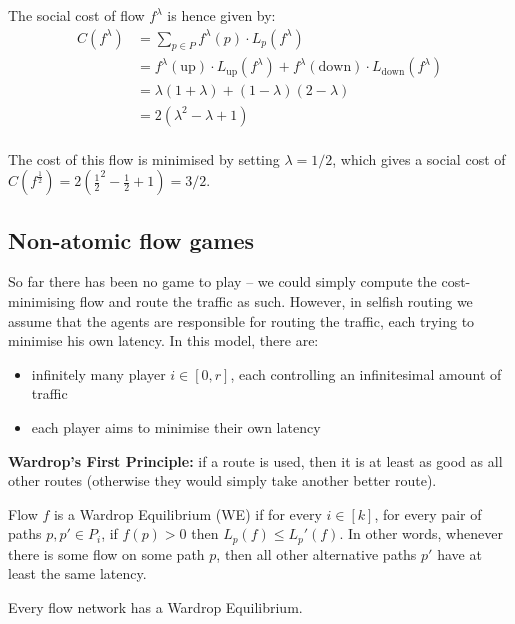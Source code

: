 The social cost of flow $f^\lambda$ is hence given by:
\begin{equation*}
	\begin{split}
		C(f^\lambda) & = \sum_{p\in P} f^\lambda (p) \cdot L_p(f^\lambda) \\
		& = f^\lambda (\text{up}) \cdot L_\text{up} (f^\lambda) + f^\lambda (\text{down}) \cdot L_\text{down}(f^\lambda) \\
		& = \lambda (1 + \lambda) + (1 - \lambda) (2 - \lambda) \\
		& = 2(\lambda^2 - \lambda + 1) \\
	\end{split}
\end{equation*}

The cost of this flow is minimised by setting $\lambda = 1/2$, which gives a
social cost of $C(f^\frac{1}{2}) = 2(\frac{1}{2}^2 - \frac{1}{2} + 1) = 3/2$.

\subsection{Non-atomic flow games}

So far there has been no game to play -- we could simply compute the
cost-minimising flow and route the traffic as such. However, in selfish routing
we assume that the agents are responsible for routing the traffic, each trying
to minimise his own latency. In this model, there are:
\begin{itemize}
	\item infinitely many player $i \in [0, r]$, each controlling an
		infinitesimal amount of traffic
	\item each player aims to minimise their own latency
\end{itemize}

\textbf{Wardrop's First Principle:} if a route is used, then it is at least as
good as all other routes (otherwise they would simply take another better
route).

\begin{definition}
	Flow $f$ is a Wardrop Equilibrium (WE) if for every $i \in [k]$, for
	every pair of paths $p, p' \in P_i$, if $f(p) > 0$ then $L_p(f) \le
	L_p'(f)$. In other words, whenever there is some flow on some path $p$,
	then all other alternative paths $p'$ have at least the same latency.
\end{definition}

\begin{fact}
	Every flow network has a Wardrop Equilibrium.
\end{fact}

